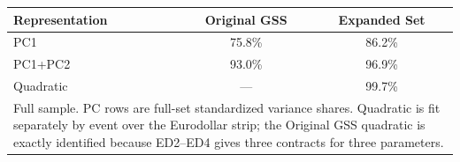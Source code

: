 \begin{tabular}{lcc}
\toprule
Representation & Original GSS & Expanded Set \\
\midrule
PC1 & 75.8\% & 86.2\% \\
PC1+PC2 & 93.0\% & 96.9\% \\
Quadratic & --- & 99.7\% \\
\midrule
\multicolumn{3}{p{0.72\linewidth}}{\footnotesize Full sample. PC rows are full-set standardized variance shares. Quadratic is fit separately by event over the Eurodollar strip; the Original GSS quadratic is exactly identified because ED2--ED4 gives three contracts for three parameters.}\\
\bottomrule
\end{tabular}
